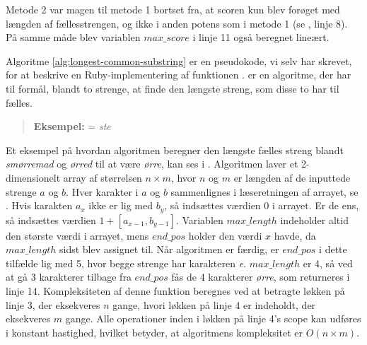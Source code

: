Metode 2 var magen til metode 1 bortset fra, at scoren kun blev forøget med længden af fællesstrengen, og ikke i anden potens som i metode 1 (se , linje 8). På samme måde blev variablen $max\_score$ i linje 11 også beregnet lineært.

\begin{algorithm} [H]
	\label{alg:compare}
	
\end{algorithm}

\begin{algorithm} [H]
	\label{alg:longest-common-substring}
	
\end{algorithm}

Algoritme \ref{alg:longest-common-substring} er en pseudokode, vi selv har skrevet, for at beskrive en Ruby-implementering\cite{longestcommonsubstringrubywiki} af funktionen .  er en algoritme, der har til formål, blandt to strenge, at finde den længste streng, som disse to har til fælles. 

\begin{quote}
\textbf{Eksempel:}  = \textit{ste}
\end{quote}

Et eksempel på hvordan algoritmen beregner den længste fælles streng blandt \textit{smørremad} og \textit{ørred} til at være \textit{ørre}, kan ses i .
Algoritmen laver et 2-dimensionelt array af størrelsen $n \times m$, hvor $n$ og $m$ er længden af de inputtede strenge $a$ og $b$. Hver karakter i $a$ og $b$ sammenlignes i læseretningen af arrayet, se . Hvis karakten $a_x$ ikke er lig med $b_y$, så indsættes værdien 0 i arrayet. Er de ens, så indsættes værdien $1 + [a_{x-1}, b_{y-1}]$.
Variablen $max\_length$ indeholder altid den største værdi i arrayet, mens $end\_pos$ holder den værdi $x$ havde, da $max\_length$ sidst blev assignet til.
Når algoritmen er færdig, er $end\_pos$ i dette tilfælde lig med 5, hvor begge strenge har karakteren \textit{e}. $max\_length$ er 4, så ved at gå 3 karakterer tilbage fra $end\_pos$ fås de 4 karakterer \textit{ørre}, som returneres i linje 14. Kompleksiteten af denne funktion beregnes ved at betragte løkken på linje 3, der eksekveres $n$ gange, hvori løkken på linje 4 er indeholdt, der eksekveres $m$ gange. Alle operationer inden i løkken på linje 4's scope kan udføres i konstant hastighed, hvilket betyder, at algoritmens kompleksitet er $O(n \times m)$.

